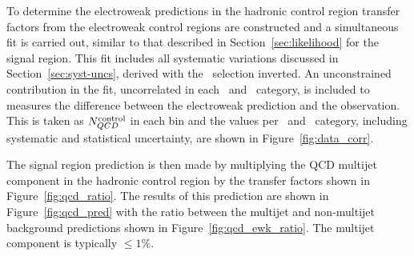 To determine the electroweak predictions in the hadronic control region transfer factors 
from the \mhtmet electroweak control regions are constructed and a simultaneous
fit is carried out, similar to that described in Section~\ref{sec:likelihood} for the signal region. 
This fit includes all systematic variations discussed in Section~\ref{sec:syst-uncs}, 
derived with the \mhtmet~selection inverted. An unconstrained contribution in the fit, 
uncorrelated in each \njet~and \scalht~category, is included to measures the difference between 
the electroweak prediction and the observation. This is taken as $N_{QCD}^{\rm control}$ in each bin and
the values per \njet~and \scalht~category, including systematic and statistical uncertainty,
are shown in Figure~\ref{fig:data_corr}. 

The signal region prediction is then made by multiplying the QCD multijet component in the hadronic 
control region by the transfer factors shown in Figure~\ref{fig:qcd_ratio}. The results of this prediction
are shown in Figure~\ref{fig:qcd_pred} with the ratio between the multijet and non-multijet background
predictions shown in Figure~\ref{fig:qcd_ewk_ratio}. The multijet component is typically $\le 1\%$. 

